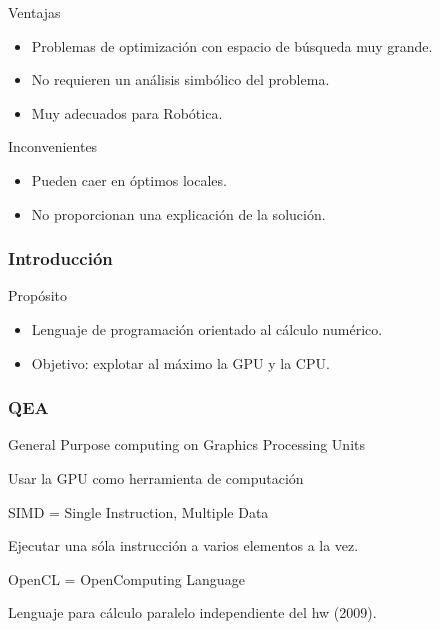 \documentclass{beamer}
\begin{document}
\begin{frame}

\begin{block}{Ventajas}
\begin{itemize}
\item Problemas de optimización con espacio de búsqueda muy grande.
\item No requieren un análisis simbólico del problema.
\item Muy adecuados para Robótica.
\end{itemize}
\end{block}

\begin{block}{Inconvenientes}
\begin{itemize}
\item Pueden caer en óptimos locales.
\item No proporcionan una explicación de la solución.
\end{itemize}
\end{block}

\end{frame}

\begin{frame}
\frametitle{Introducción}
\begin{block}{Propósito}
\begin{itemize}
\item Lenguaje de programación orientado al cálculo numérico.
\item Objetivo: explotar al máximo la GPU y la CPU.
\end{itemize}
\end{block}
\end{frame}

\begin{frame}
\frametitle{QEA}


General	Purpose computing on Graphics Processing Units

Usar la GPU como herramienta de computación

\pause

SIMD = Single Instruction, Multiple Data

Ejecutar una sóla instrucción a varios elementos a la vez.

\pause

OpenCL = OpenComputing Language

Lenguaje para cálculo paralelo independiente del hw (2009).


\end{frame}
\end{document}

